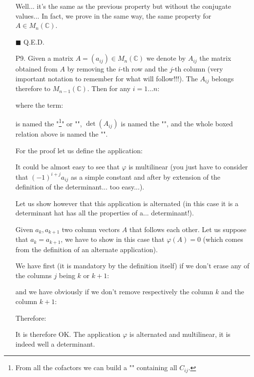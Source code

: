 \begin{enumerate}
		\begin{dem}
		Well... it's the same as the previous property but without the conjugate values... In fact, we prove in the same way, the same property for $A\in M_n(\mathbb{C})$.
		\begin{flushright}
			$\blacksquare$  Q.E.D.
		\end{flushright}
		\end{dem}
		
		\item[P9.] Given a matrix $A=(a_{ij})\in M_n(\mathbb{C})$ we denote by $A_{ij}$ the matrix obtained from $A$ by removing the $i$-th row and the $j$-th column (very important notation to remember for what will follow!!!). The $A_{ij}$ belongs therefore to $M_{n-1}(\mathbb{C})$. Then for any $i=1...n$:
		
		where the term:
		
		is named the "\label{cofactor}\footnote{From all the cofactors we can build a "" containing all $C_{ij}$.}" or "\label{partial determinant}", $\det(A_{ij})$ is named the "", and the whole boxed relation above is named the "\index{cofactor expansion theorem}".
		\begin{dem}
		For the proof let us define the application:
		
		It could be almost easy to see that $\varphi$ is multilinear (you just have to consider that $(-1)^{i+j}a_{ij}$ as a simple constant and after by extension of the definition of the determinant... too easy...).

		Let us show however that this application is alternated (in this case it is a determinant hat has all the properties of a... determinant!).
	
		Given $a_k,a_{k+1}$ two column vectors $A$ that follows each other. Let us suppose that $a_k=a_{k+1}$, we have to show in this case that $\varphi(A)=0$ (which comes from the definition of an alternate application).
	
		We have first (it is mandatory by the definition itself) if we don't erase any of the columns $j$ being $k$ or $k+1$:
		
		and we have obviously if we don't remove respectively the column $k$ and the column $k+1$:
		
		Therefore:
		
		It is therefore OK. The application $\varphi$ is alternated and multilinear, it is indeed well a determinant.
		

\end{dem}
\end{enumerate}
